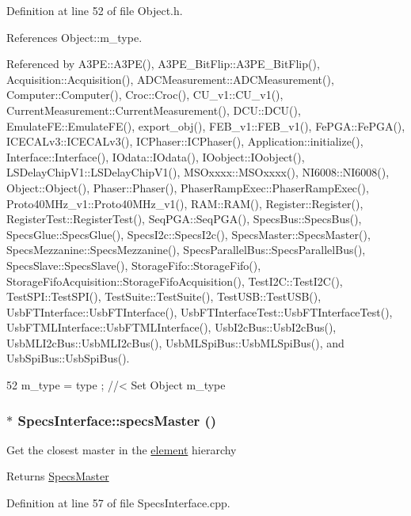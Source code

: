 Definition at line 52 of file Object.h.

References Object::m\_\-type.

Referenced by A3PE::A3PE(), A3PE\_\-BitFlip::A3PE\_\-BitFlip(), Acquisition::Acquisition(), ADCMeasurement::ADCMeasurement(), Computer::Computer(), Croc::Croc(), CU\_\-v1::CU\_\-v1(), CurrentMeasurement::CurrentMeasurement(), DCU::DCU(), EmulateFE::EmulateFE(), export\_\-obj(), FEB\_\-v1::FEB\_\-v1(), FePGA::FePGA(), ICECALv3::ICECALv3(), ICPhaser::ICPhaser(), Application::initialize(), Interface::Interface(), IOdata::IOdata(), IOobject::IOobject(), LSDelayChipV1::LSDelayChipV1(), MSOxxxx::MSOxxxx(), NI6008::NI6008(), Object::Object(), Phaser::Phaser(), PhaserRampExec::PhaserRampExec(), Proto40MHz\_\-v1::Proto40MHz\_\-v1(), RAM::RAM(), Register::Register(), RegisterTest::RegisterTest(), SeqPGA::SeqPGA(), SpecsBus::SpecsBus(), SpecsGlue::SpecsGlue(), SpecsI2c::SpecsI2c(), SpecsMaster::SpecsMaster(), SpecsMezzanine::SpecsMezzanine(), SpecsParallelBus::SpecsParallelBus(), SpecsSlave::SpecsSlave(), StorageFifo::StorageFifo(), StorageFifoAcquisition::StorageFifoAcquisition(), TestI2C::TestI2C(), TestSPI::TestSPI(), TestSuite::TestSuite(), TestUSB::TestUSB(), UsbFTInterface::UsbFTInterface(), UsbFTInterfaceTest::UsbFTInterfaceTest(), UsbFTMLInterface::UsbFTMLInterface(), UsbI2cBus::UsbI2cBus(), UsbMLI2cBus::UsbMLI2cBus(), UsbMLSpiBus::UsbMLSpiBus(), and UsbSpiBus::UsbSpiBus().


\begin{DoxyCode}
52 { m_type  = type  ; } //< Set Object m_type
\end{DoxyCode}
\hypertarget{classSpecsInterface_a3d497c965fb6ec06b49a54b7901a22b2}{
\subsubsection[{specsMaster}]{ $\ast$ SpecsInterface::specsMaster ()}}
\label{classSpecsInterface_a3d497c965fb6ec06b49a54b7901a22b2}
Get the closest master in the \hyperlink{namespaceelement}{element} hierarchy \begin{DoxyReturn}{Returns}
\hyperlink{classSpecsMaster}{SpecsMaster} 
\end{DoxyReturn}


Definition at line 57 of file SpecsInterface.cpp.

